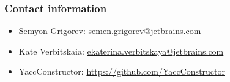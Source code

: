 \documentclass{beamer}
\begin{document}
\begin{frame}
\transwipe[direction=90]
\frametitle{Contact information}
\begin{itemize}
  \item Semyon Grigorev: \href{mailto:semen.grigorev@jetbrains.com}{semen.grigorev@jetbrains.com}
  \item Kate Verbitskaia: \href{mailto:ekaterina.verbitskaya@jetbrains.com}{ekaterina.verbitskaya@jetbrains.com}
\end{itemize}
\begin{itemize}
  \item YaccConstructor: \href{https://github.com/YaccConstructor}{https://github.com/YaccConstructor}
\end{itemize}
\end{frame}
\end{document}
